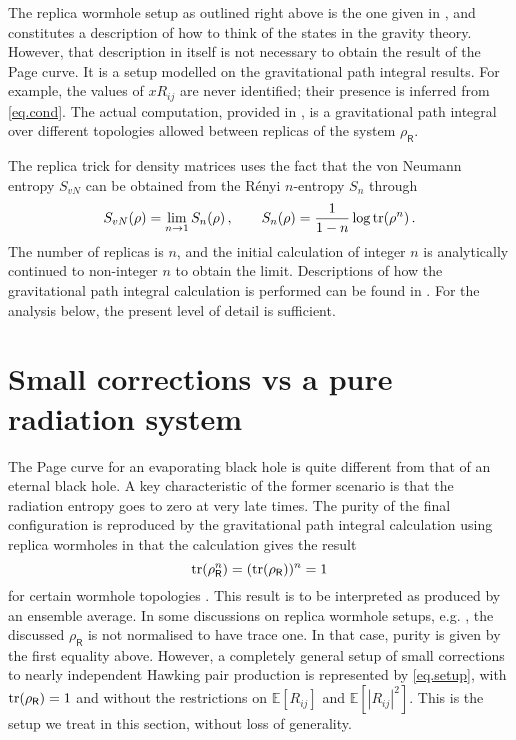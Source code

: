 \documentclass[11pt]{article}
\def\be{\begin{equation}}
\def\ee{\end{equation}}
\numberwithin{equation}{section}
\begin{document}
The replica wormhole setup as outlined right above is the one given in \cite{Penington:2019kki}, and constitutes a description of how to think of the states in the gravity theory. However, that description in itself is not necessary to obtain the result of the Page curve. It is a setup modelled on the gravitational path integral results. For example, the values of $xR_{ij}$ are never identified; their presence is inferred from \eqref{eq.cond}. The actual computation, provided in \cite{Penington:2019kki,Almheiri:2019qdq}, is a gravitational path integral over different topologies allowed between replicas of the system $\rho_\textsf{R}$.

The replica trick for density matrices uses the fact that the von Neumann entropy $S_{vN}$ can be obtained from the R\'enyi $n$-entropy $S_n$ through
\be
S_{vN}(\rho)=\lim_{n\rightarrow1}S_n(\rho)\,,\qquad S_n(\rho)=\frac{1}{1-n}\log {\rm tr}(\rho^n)\,.
\ee
The number of replicas is $n$, and the initial calculation of integer $n$ is analytically continued to non-integer $n$ to obtain the limit. Descriptions of how the gravitational path integral calculation is performed can be found in \cite{Penington:2019kki,Almheiri:2019qdq}. For the analysis below, the present level of detail is sufficient.

\section{Small corrections vs a pure radiation system}\label{s.small}
The Page curve for an evaporating black hole is quite different from that of an eternal black hole. A key characteristic of the former scenario is that the radiation entropy goes to zero at very late times. The purity of the final configuration is reproduced by the gravitational path integral calculation using replica wormholes in that the calculation gives the result
\be
{\rm tr}(\rho^n_\textsf{R})=({\rm tr}(\rho_\textsf{R}))^n=1
\ee
for certain wormhole topologies \cite{Penington:2019kki,Almheiri:2019qdq}. This result is to be interpreted as produced by an ensemble average. In some discussions on replica wormhole setups, e.g. \cite{Almheiri:2020cfm,Marolf:2020rpm}, the discussed $\rho_\textsf{R}$ is not normalised to have trace one. In that case, purity is given by the first equality above. However, a completely general setup of small corrections to nearly independent Hawking pair production is represented by \eqref{eq.setup}, with ${\rm tr}(\rho_\textsf{R})=1$ and without the restrictions on $\mathbb{E}\left[R_{ij}\right]$ and $\mathbb{E}\left[|R_{ij}|^2\right]$. This is the setup we treat in this section, without loss of generality.
\end{document}
